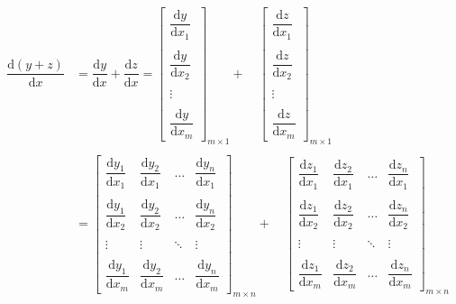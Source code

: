 \documentclass[withoutpreface,bwprint]{cumcmthesis} %
\begin{document}
	\begin{align*}
		\dfrac{\mathrm{d} (y+z)}{\mathrm{d} x}&=\dfrac{\mathrm{d} y}{\mathrm{d} x}+\dfrac{\mathrm{d} z}{\mathrm{d} x}
		=\left[
			\begin{array}{c}
				\dfrac{\mathrm{d} y}{\mathrm{d} x_1}\\\\
				\dfrac{\mathrm{d} y}{\mathrm{d} x_2}\\\\
				\vdots\\\\
				\dfrac{\mathrm{d} y}{\mathrm{d} x_m}
			\end{array}
		\right]_{m{\times}1}+\quad \left[
		\begin{array}{c}
			\dfrac{\mathrm{d} z}{\mathrm{d} x_1}\\\\
			\dfrac{\mathrm{d} z}{\mathrm{d} x_2}\\\\
			\vdots\\\\
			\dfrac{\mathrm{d} z}{\mathrm{d} x_m}
		\end{array}
		\right]_{m{\times}1}\\\\
		&=\left[
		\begin{array}{cccc}
			\dfrac{\mathrm{d} y_1}{\mathrm{d} x_1} & \dfrac{\mathrm{d} y_2}{\mathrm{d} x_1} & \ldots & \dfrac{\mathrm{d} y_n}{\mathrm{d} x_1} \\\\
			\dfrac{\mathrm{d} y_1}{\mathrm{d} x_2} & \dfrac{\mathrm{d} y_2}{\mathrm{d} x_2} & \ldots & \dfrac{\mathrm{d} y_n}{\mathrm{d} x_2} \\\\
			\vdots & \vdots & \ddots &\vdots\\\\
			\dfrac{\mathrm{d} y_1}{\mathrm{d} x_m} & \dfrac{\mathrm{d} y_2}{\mathrm{d} x_m} & \ldots & \dfrac{\mathrm{d} y_n}{\mathrm{d} x_m} 
		\end{array}
		\right]_{m{\times}n}+\quad \left[
		\begin{array}{cccc}
			\dfrac{\mathrm{d} z_1}{\mathrm{d} x_1} & \dfrac{\mathrm{d} z_2}{\mathrm{d} x_1} & \ldots & \dfrac{\mathrm{d} z_n}{\mathrm{d} x_1} \\\\
			\dfrac{\mathrm{d} z_1}{\mathrm{d} x_2} & \dfrac{\mathrm{d} z_2}{\mathrm{d} x_2} & \ldots & \dfrac{\mathrm{d} z_n}{\mathrm{d} x_2} \\\\
			\vdots & \vdots & \ddots &\vdots\\\\
			\dfrac{\mathrm{d} z_1}{\mathrm{d} x_m} & \dfrac{\mathrm{d} z_2}{\mathrm{d} x_m} & \ldots & \dfrac{\mathrm{d} z_n}{\mathrm{d} x_m} 
		\end{array}
		\right]_{m{\times}n}
	\end{align*}
\end{document}
